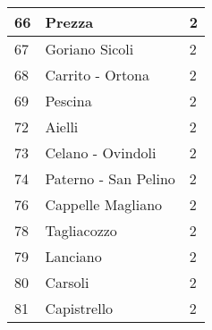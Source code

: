\begin{table}[]
\begin{tabular}{|p{1cm}|p{4cm}|p{2cm}|}
\rowcolor[HTML]{FFFE65} 
66  & Prezza                                   & 2      \\ \hline
\rowcolor[HTML]{FFFE65} 
67  & Goriano Sicoli                           & 2      \\ \hline
\rowcolor[HTML]{FFFE65} 
68  & Carrito - Ortona                         & 2      \\ \hline
\rowcolor[HTML]{FFFE65} 
69  & Pescina                                  & 2      \\ \hline
\rowcolor[HTML]{FFFE65} 
72  & Aielli                                   & 2      \\ \hline
\rowcolor[HTML]{FFFE65} 
73  & Celano - Ovindoli                        & 2      \\ \hline
\rowcolor[HTML]{FFFE65} 
74  & Paterno - San Pelino                     & 2      \\ \hline
\rowcolor[HTML]{FFFE65} 
76  & Cappelle Magliano                        & 2      \\ \hline
\rowcolor[HTML]{FFFE65} 
78  & Tagliacozzo                              & 2      \\ \hline
\rowcolor[HTML]{FFFE65} 
79  & Lanciano                                 & 2      \\ \hline
\rowcolor[HTML]{FFFE65} 
80  & Carsoli                                  & 2      \\ \hline
\rowcolor[HTML]{FFFE65} 
81  & Capistrello                              & 2      \\ \hline


\end{tabular}
\end{table}


